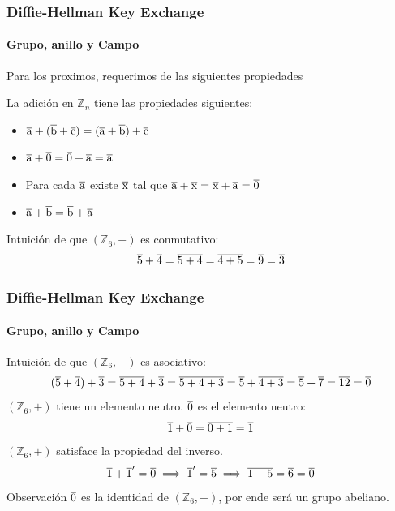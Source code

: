 \documentclass[spanish, mexico]{beamer}
\begin{document}
	\begin{frame}
	    \frametitle{Diffie-Hellman Key Exchange}
		\framesubtitle{Grupo, anillo y Campo}
		Para los proximos, requerimos de las siguientes propiedades
        \begin{theorem}
            La adición en $\mathbb{Z}_n$ tiene las propiedades siguientes:
            \begin{itemize}
                \item $\overline{\rm a} + (\overline{\rm b} + \overline{\rm c}) = (\overline{\rm a} + \overline{\rm b}) + \overline{\rm c}$
                \item $\overline{\rm a} + \overline{\rm 0} = \overline{\rm 0} + \overline{\rm a} = \overline{\rm a}$
                \item Para cada $\overline{\rm a}$ existe $\overline{\rm x}$ tal que $\overline{\rm a} + \overline{\rm x} = \overline{\rm x} + \overline{\rm a} = \overline{\rm 0}$
                \item $\overline{\rm a} + \overline{\rm b} = \overline{\rm b} + \overline{\rm a}$
            \end{itemize}
        \end{theorem}
        Intuición de que $(\mathbb{Z}_6, + )$ es conmutativo:
            $$\overline{\rm 5} + \overline{\rm 4} = \overline{\rm 5 + 4} = \overline{\rm 4 + 5} = \overline{\rm 9} = \overline{\rm 3}$$
	\end{frame}
	
	\begin{frame}
	    \frametitle{Diffie-Hellman Key Exchange}
		\framesubtitle{Grupo, anillo y Campo}
		Intuición de que $(\mathbb{Z}_6, + )$ es asociativo:
            $$(\overline{\rm 5} + \overline{\rm 4}) + \overline{\rm 3} = \overline{\rm 5 + 4} + \overline{\rm 3} = \overline{\rm 5 + 4 + 3} = \overline{\rm 5} + \overline{\rm 4 + 3} = \overline{\rm 5} + \overline{\rm 7} = \overline{\rm 12} = \overline{\rm 0}$$
        $(\mathbb{Z}_6, +)$ tiene un elemento neutro. $\overline{\rm 0}$ es el elemento neutro:
        $$\overline{\rm 1} + \overline{\rm 0} = \overline{\rm 0 + 1} = \overline{\rm 1}$$
        $(\mathbb{Z}_6, +)$ satisface la propiedad del inverso.
        $$\overline{\rm 1} + \overline{\rm 1}' = \overline{\rm 0} \implies \overline{\rm 1}' = \overline{\rm 5} \implies \overline{\rm 1 + 5} = \overline{\rm 6} = \overline{\rm 0}$$
        Observación $\overline{\rm 0}$ es la identidad de $(\mathbb{Z}_6, +)$, por ende será un grupo abeliano.
	\end{frame}
	
\end{document}
